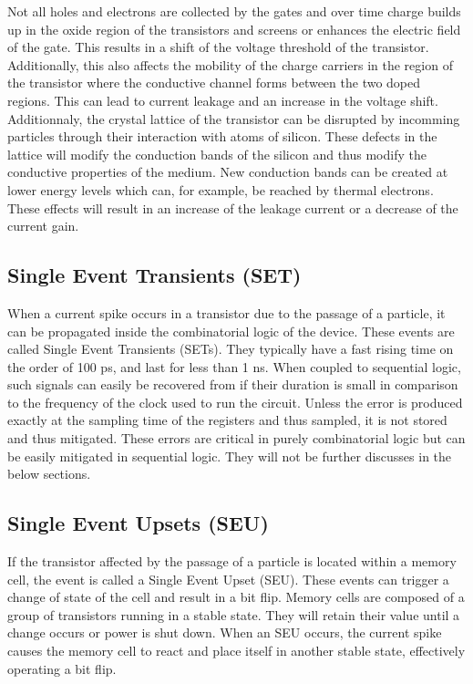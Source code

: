       Not all holes and electrons are collected by the gates and over time charge builds up in the oxide region of the transistors and screens or enhances the electric field of the gate. This results in a shift of the voltage threshold of the transistor. Additionally, this also affects the mobility of the charge carriers in the region of the transistor where the conductive channel forms between the two doped regions. This can lead to current leakage and an increase in the voltage shift. \\

      Additionnaly, the crystal lattice of the transistor can be disrupted by incomming particles through their interaction with atoms of silicon. These defects in the lattice will modify the conduction bands of the silicon and thus modify the conductive properties of the medium. New conduction bands can be created at lower energy levels which can, for example, be reached by thermal electrons. These effects will result in an increase of the leakage current or a decrease of the current gain.

    \subsection{Single Event Transients (SET)}

      When a current spike occurs in a transistor due to the passage of a particle, it can be propagated inside the combinatorial logic of the device. These events are called Single Event Transients (SETs). They typically have a fast rising time on the order of 100 ps, and last for less than 1 ns. When coupled to sequential logic, such signals can easily be recovered from if their duration is small in comparison to the frequency of the clock used to run the circuit. Unless the error is produced exactly at the sampling time of the registers and thus sampled, it is not stored and thus mitigated. These errors are critical in purely combinatorial logic but can be easily mitigated in sequential logic. They will not be further discusses in the below sections.

    \subsection{Single Event Upsets (SEU)}

      If the transistor affected by the passage of a particle is located within a memory cell, the event is called a Single Event Upset (SEU). These events can trigger a change of state of the cell and result in a bit flip. Memory cells are composed of a group of transistors running in a stable state. They will retain their value until a change occurs or power is shut down. When an SEU occurs, the current spike causes the memory cell to react and place itself in another stable state, effectively operating a bit flip.

